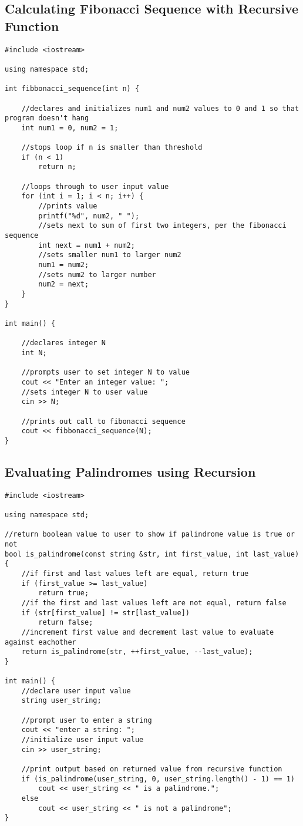 \documentclass[11pt]{article}
\begin{document}
\subsection*{Calculating Fibonacci Sequence with Recursive Function}
\begin{lstlisting}
#include <iostream>

using namespace std;

int fibbonacci_sequence(int n) {

    //declares and initializes num1 and num2 values to 0 and 1 so that program doesn't hang
    int num1 = 0, num2 = 1;

    //stops loop if n is smaller than threshold
    if (n < 1)
        return n;

    //loops through to user input value
    for (int i = 1; i < n; i++) {
        //prints value
        printf("%d", num2, " ");
        //sets next to sum of first two integers, per the fibonacci sequence
        int next = num1 + num2;
        //sets smaller num1 to larger num2
        num1 = num2;
        //sets num2 to larger number
        num2 = next;
    }
}

int main() {

    //declares integer N
    int N;

    //prompts user to set integer N to value
    cout << "Enter an integer value: ";
    //sets integer N to user value
    cin >> N;

    //prints out call to fibonacci sequence
    cout << fibbonacci_sequence(N);
}
\end{lstlisting}

\subsection*{Evaluating Palindromes using Recursion}
\begin{lstlisting}
#include <iostream>

using namespace std;

//return boolean value to user to show if palindrome value is true or not
bool is_palindrome(const string &str, int first_value, int last_value) {
    //if first and last values left are equal, return true
    if (first_value >= last_value)
        return true;
    //if the first and last values left are not equal, return false
    if (str[first_value] != str[last_value])
        return false;
    //increment first value and decrement last value to evaluate against eachother
    return is_palindrome(str, ++first_value, --last_value);
}

int main() {
    //declare user input value
    string user_string;

    //prompt user to enter a string
    cout << "enter a string: ";
    //initialize user input value
    cin >> user_string;

    //print output based on returned value from recursive function
    if (is_palindrome(user_string, 0, user_string.length() - 1) == 1)
        cout << user_string << " is a palindrome.";
    else
        cout << user_string << " is not a palindrome";
}
\end{lstlisting}
\end{document}
